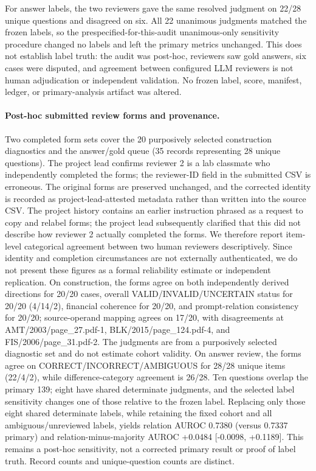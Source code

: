 \documentclass[11pt]{article}
\begin{document}
For answer labels, the two reviewers gave the same resolved judgment on 22/28 unique questions and disagreed on six. All 22 unanimous judgments matched the frozen labels, so the prespecified-for-this-audit unanimous-only sensitivity procedure changed no labels and left the primary metrics unchanged. This does not establish label truth: the audit was post-hoc, reviewers saw gold answers, six cases were disputed, and agreement between configured LLM reviewers is not human adjudication or independent validation. No frozen label, score, manifest, ledger, or primary-analysis artifact was altered.

\paragraph{Post-hoc submitted review forms and provenance.} Two completed form sets cover the 20 purposively selected construction diagnostics and the answer/gold queue (35 records representing 28 unique questions). The project lead confirms reviewer 2 is a lab classmate who independently completed the forms; the reviewer-ID field in the submitted CSV is erroneous. The original forms are preserved unchanged, and the corrected identity is recorded as project-lead-attested metadata rather than written into the source CSV. The project history contains an earlier instruction phrased as a request to copy and relabel forms; the project lead subsequently clarified that this did not describe how reviewer 2 actually completed the forms. We therefore report item-level categorical agreement between two human reviewers descriptively. Since identity and completion circumstances are not externally authenticated, we do not present these figures as a formal reliability estimate or independent replication. On construction, the forms agree on both independently derived directions for 20/20 cases, overall VALID/INVALID/UNCERTAIN status for 20/20 (4/14/2), financial coherence for 20/20, and prompt-relation consistency for 20/20; source-operand mapping agrees on 17/20, with disagreements at AMT/2003/page\_27.pdf-1, BLK/2015/page\_124.pdf-4, and FIS/2006/page\_31.pdf-2. The judgments are from a purposively selected diagnostic set and do not estimate cohort validity. On answer review, the forms agree on CORRECT/INCORRECT/AMBIGUOUS for 28/28 unique items (22/4/2), while difference-category agreement is 26/28. Ten questions overlap the primary 139; eight have shared determinate judgments, and the selected label sensitivity changes one of those relative to the frozen label. Replacing only those eight shared determinate labels, while retaining the fixed cohort and all ambiguous/unreviewed labels, yields relation AUROC 0.7380 (versus 0.7337 primary) and relation-minus-majority AUROC +0.0484 [-0.0098, +0.1189]. This remains a post-hoc sensitivity, not a corrected primary result or proof of label truth. Record counts and unique-question counts are distinct.
\end{document}
